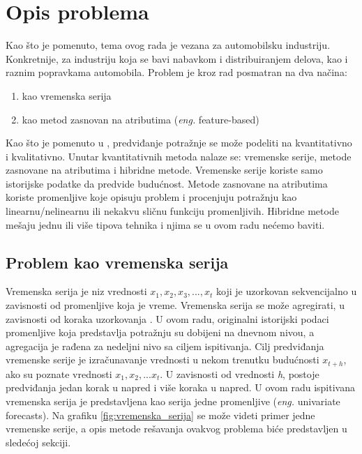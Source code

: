\documentclass[12pt,oneside]{memoir}
\begin{document}
\section{Opis problema}
\label{section:opis_problema}
Kao što je pomenuto, tema ovog rada je vezana za automobilsku industriju. Konkretnije, za industriju koja se bavi nabavkom i distribuiranjem delova, kao i raznim popravkama automobila. Problem je kroz rad posmatran na dva načina: 
\begin{enumerate}
    \item kao vremenska serija
    \item kao metod zasnovan na atributima (\textit{eng.} feature-based)
\end{enumerate}
Kao što je pomenuto u \cite{choi2020forecasting}, predviđanje potražnje se može podeliti na kvantitativno i kvalitativno. Unutar kvantitativnih metoda nalaze se: vremenske serije, metode zasnovane na atributima i hibridne metode. Vremenske serije koriste samo istorijske podatke da predvide budućnost. Metode zasnovane na atributima koriste promenljive koje opisuju problem i procenjuju potražnju kao linearnu/nelinearnu ili nekakvu sličnu funkciju promenljivih. Hibridne metode mešaju jednu ili više tipova tehnika i njima se u ovom radu nećemo baviti.

\subsection{Problem kao vremenska serija}
Vremenska serija je niz vrednosti $x_1, x_2, x_3, ..., x_t$ koji je uzorkovan sekvencijalno u zavisnosti od promenljive koja je vreme. Vremenska serija se može agregirati, u zavisnosti od koraka uzorkovanja \cite{henkelmann2018deep}. U ovom radu, originalni istorijski podaci promenljive koja predstavlja potražnju su dobijeni na dnevnom nivou, a agregacija je rađena za nedeljni nivo sa ciljem ispitivanja.
Cilj predviđanja vremenske serije je izračunavanje vrednosti u nekom trenutku budućnosti $x_{t+h}$, ako su poznate vrednosti $x_{1}, x_{2},...x_{t}$. U zavisnosti od vrednosti \textit{h}, postoje predviđanja jedan korak u napred i više koraka u napred. U ovom radu ispitivana vremenska serija je predstavljena kao serija jedne promenljive (\textit{eng.} univariate forecasts). Na grafiku \ref{fig:vremenska_serija} se može videti primer jedne vremenske serije, a opis metode rešavanja ovakvog problema biće predstavljen u sledećoj sekciji.
\end{document}
